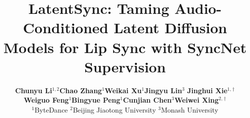 \documentclass[10pt,twocolumn,letterpaper]{article}
\title{LatentSync: Taming Audio-Conditioned Latent Diffusion Models for Lip Sync with SyncNet Supervision}
\author{
    \textbf{Chunyu Li}$^{1,2}$\qquad \textbf{Chao Zhang}$^1$\qquad \textbf{Weikai Xu}$^1$\qquad \textbf{Jingyu Lin}$^3$\qquad
\textbf{Jinghui Xie}$^{1,}$$^{\dag}$\\ \textbf{Weiguo Feng}$^1$\qquad \textbf{Bingyue Peng}$^1$\qquad \textbf{Cunjian Chen}$^3$\qquad \textbf{Weiwei Xing}$^{2,}$$^{\dag}$ \\[5pt] 
$^1$ByteDance \qquad $^2$Beijing Jiaotong University \qquad $^3$Monash University
}
\begin{document}
\maketitle






{
    \small
    
    
}


\end{document}
